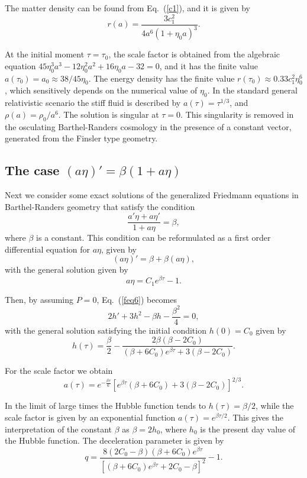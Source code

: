 \documentclass[aps,superscriptaddress, showpacs,preprintnumbers, superscriptaddress, nofootinbibt,twocolumn]{revtex4-2}
\def\be{\begin{equation}}
\def\ee{\end{equation}}
\begin{document}
The matter density can be found from Eq.~(\ref{c1}), and it is given by
\be
r(a)=\frac{3 c_1^2}{4 a^6 \left(1+\eta _0 a\right)^3}.
\ee

At the initial moment $\tau=\tau_0$, the scale factor is obtained from the algebraic equation $45 \eta _0^3a^3 -12 \eta _0^2a^2 +16 \eta _0 a -32 =0$, and it has the finite value $a\left(\tau_0\right)=a_0\approx 38/45\eta _0$. The energy density has the finite value $r\left(\tau _0\right)\approx 0.33c_1^2\eta _0^6$, which sensitively depends on the numerical value of $\eta _0$. In the standard general relativistic scenario the stiff fluid is described by $a(\tau)=\tau ^{1/3}$, and $\rho (a)=\rho _0/a^6$. The solution is singular at $\tau =0$. This singularity is removed in the osculating Barthel-Randers cosmology in the presence of a constant vector,  generated from the Finsler type geometry.

\subsection{The case $(a\eta)'=\beta(1+a\eta)$ }

Next we consider some exact solutions of the generalized Friedmann equations in Barthel-Randers geometry that satisfy the condition
\be
\frac{a'\eta+a\eta'}{1+a\eta}=\beta,
\ee
where $\beta $ is a constant. This condition can be reformulated as a first order differential equation for $a\eta$, given by
\be
(a\eta)'=\beta+\beta(a\eta),
\ee
with the general solution given by
\be
a\eta=C_1e^{\beta \tau}-1.
\ee

Then, by assuming $P=0$, Eq.~(\ref{feq6}) becomes
\be
2h'+3h^2-\beta h-\frac{\beta ^2}{4}=0,
\ee
with the general solution satisfying the initial condition $h(0)=C_0$ given by
\be
h(\tau)=\frac{\beta }{2}-\frac{2 \beta  \left(\beta -2 C_0\right)}{(\beta +6
   C_0)e^{\beta  \tau } +3 \left(\beta-2 C_0\right)}.
\ee

For the scale factor we obtain
\be
a(\tau)=e^{-\frac{\beta  \tau }{6}} \left[e^{\beta  \tau } (\beta +6 C_0)+3 \left(\beta -2
   C_0\right)\right]^{2/3}.
\ee

In the limit of large times the Hubble function tends to $h(\tau)=\beta /2$, while the scale factor is given by an exponential function $a(\tau)=e^{\beta \tau/2}$.  This gives the interpretation of the constant $\beta $ as $\beta =2h_0$, where $h_0$ is the present day value of the Hubble function. The deceleration parameter is given by
\be
q=\frac{8  \left( 2 C_0-\beta\right) \left(\beta +6 C_0\right)e^{\beta  \tau }}{\left[
    \left(\beta +6 C_0\right)e^{\beta  \tau } +2 C_0-\beta\right]^2}-1.
\ee
\end{document}
